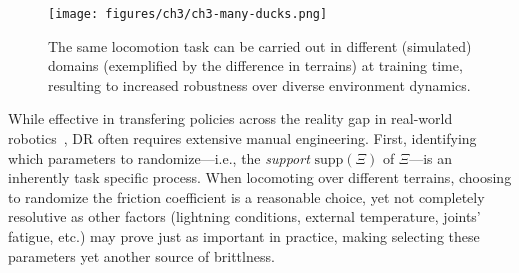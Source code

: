 \begin{figure}
    \centering
    \texttt{[image: figures/ch3/ch3-many-ducks.png]}
    \caption{The same locomotion task can be carried out in different (simulated) domains (exemplified by the difference in terrains) at training time, resulting to increased robustness over diverse environment dynamics.}
    \label{fig:ducks-on-terrains}
\end{figure}

While effective in transfering policies across the reality gap in real-world robotics~\citep{tobinDomainRandomizationTransferring2017,akkayaSolvingRubiksCube2019, jiDribbleBotDynamicLegged2023,tiboniDomainRandomizationEntropy2024}, DR often requires extensive manual engineering.
First, identifying which parameters to randomize---i.e., the \emph{support} \( \text{supp} (\Xi) \) of \( \Xi \)---is an inherently task specific process.
When locomoting over different terrains, choosing to randomize the friction coefficient is a reasonable choice, yet not completely resolutive as other factors (lightning conditions, external temperature, joints' fatigue, etc.) may prove just as important in practice, making selecting these parameters yet another source of brittlness.

